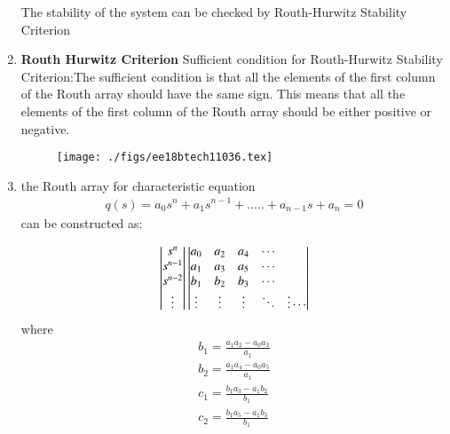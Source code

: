 \begin{enumerate}[label=\thesection.\arabic*.,ref=\thesection.\theenumi]
The stability of the system can be checked by Routh-Hurwitz Stability Criterion 


\item
\textbf{Routh Hurwitz Criterion}
Sufficient condition for Routh-Hurwitz Stability Criterion:The sufficient condition is that all the elements of the first column of the Routh array should have the same sign. This means that all the elements of the first column of the Routh array should be either positive or negative.\vspace{16pt}


\begin{figure}
\centering
\texttt{[image: ./figs/ee18btech11036.tex]}
\end{figure}



\item
the Routh array for characteristic equation
\begin{multline}
q(s) = a_0s^n+a_1s^{n-1}+.....+a_{n-1}s+a_n = 0
\end{multline}
 can be constructed as:
 
\begin{align}
\begin{vmatrix}s^n\\s^{n-1}\\s^{n-2} \\ \vdots\end{vmatrix}
 \begin{vmatrix}a_0 & a_2 & a_4 & \cdots \\
a_1 & a_3 & a_5 & \cdots  \\
b_1 & b_2 & b_3 & \cdots \\
\vdots & \vdots & \vdots & \ddots &\vdots 
 \cdots \\\end{vmatrix}
\end{align}
%
 where
 \begin{align}
 b_1 =\frac{ a_1a_2-a_0a_3}{a_1}  
 \\
 b_2 =\frac{ a_1a_4-a_0a_5}{a_1} 
 \\
 c_1=\frac{ b_1a_3-a_1b_2}{b_1} 
\\
 c_2=\frac{ b_1a_5-a_1b_3}{b_1}  
\end{align}




\end{enumerate}
